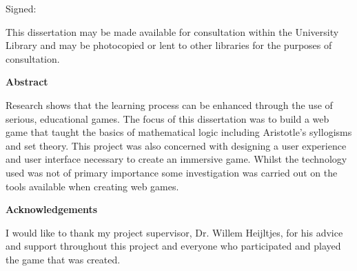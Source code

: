 \documentclass[12pt,a4paper]{report}
\begin{document}
Signed:

\vspace*{\fill}



\newpage
\clearpage
\vspace*{\fill}
\begin{center}
\thispagestyle{plain}
\begin{minipage}{.8\textwidth}
This dissertation may be made available for consultation within the University
Library and may be photocopied or lent to other libraries for the purposes of consultation.

\end{minipage}
\end{center}
\vfill
\clearpage

\newpage
\clearpage
\vspace*{\fill}
\begin{center}
\thispagestyle{plain}
\begin{minipage}{.8\textwidth}
\begin{center}
\textbf{Abstract}
\end{center}

Research shows that the learning process can be enhanced through the use of serious, educational games. The focus of this dissertation was to build a web game that taught the basics of mathematical logic including Aristotle's syllogisms and set theory. This project was also concerned with designing a user experience and user interface necessary to create an immersive game. Whilst the technology used was not of primary importance some investigation was carried out on the tools available when creating web games.
\end{minipage}
\end{center}
\vfill
\clearpage%

\newpage
\clearpage
\vspace*{\fill}
\begin{center}
\thispagestyle{plain}
\begin{minipage}{.8\textwidth}
\begin{center}
\textbf{Acknowledgements}
\end{center}

I would like to thank my project supervisor, Dr. Willem Heijltjes, for his advice and support throughout this project and everyone who participated and played the game that was created.

\end{minipage}
\end{center}
\vfill
\clearpage%
\end{document}
